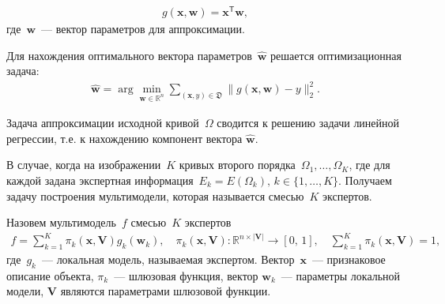 \documentclass[12pt]{a&t}
\begin{document}
\begin{gather}
	g(\mathbf{x}, \mathbf{w}) = \mathbf{x}^\mathsf{T} \mathbf{w},
\end{gather} 
где~$\mathbf{w}$~--- вектор параметров для аппроксимации.

Для нахождения оптимального вектора параметров~$\hat{\mathbf {w}}$ решается оптимизационная задача:
\begin{gather}
	\hat{\mathbf{w}} = \arg\min_{\mathbf{w}\in\mathbb{R}^n} \sum_{\left(\mathbf{x}, y\right) \in \mathfrak{D}}\|g(\mathbf{x}, \mathbf{w}) - y \|_2^2.
\end{gather} 

Задача аппроксимации исходной кривой~$\Omega$ сводится к решению задачи линейной регрессии, т.е. к нахождению компонент вектора $\hat{\mathbf{w}}$.

В случае, когда на изображении~$K$ кривых второго порядка~$\Omega_1, \dots, \Omega_K$, где для каждой задана экспертная информация~$E_k = E(\Omega_k), \, k \in \{1, \dots, K\}.$ Получаем задачу построения мультимодели, которая называется смесью~$K$ экспертов.

\begin{definition}
Назовем мультимодель~$f$ смесью~$K$ экспертов
\begin{gather}
	f = \sum\limits_{k = 1}^{K}\pi_k(\mathbf{x}, \mathbf{V})g_k(\mathbf{w}_k),  \quad \pi_k(\mathbf{x}, \mathbf{V}): \mathbb{R}^{n\times |\mathbf{V}|} \rightarrow [0, \, 1], \quad \sum\limits_{k = 1}^{K}\pi_k(\mathbf{x}, \mathbf{V}) = 1, 
\end{gather}
где~$g_k$~--- локальная модель, называемая экспертом. Вектор~$\mathbf{x}$~--- признаковое описание объекта, $\pi_k$~--- шлюзовая функция, вектор $\mathbf{w}_k$~--- параметры локальной модели, $\mathbf{V}$ являются параметрами шлюзовой функции.
\end{definition}
\end{document}
